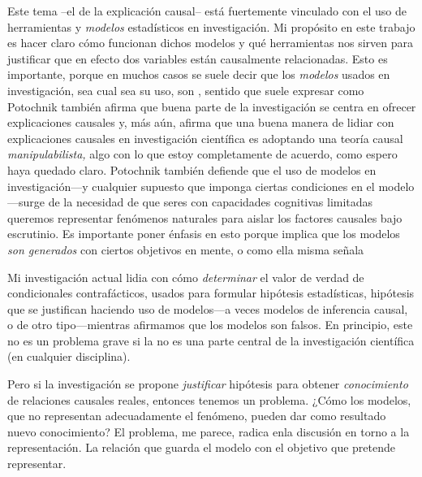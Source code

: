 Este tema --el de la explicación causal-- está fuertemente
vinculado con el uso de herramientas y \emph{modelos}
estadísticos en investigación. Mi propósito en este trabajo
es hacer claro cómo funcionan dichos modelos y qué
herramientas nos sirven para justificar que en efecto dos
variables están causalmente relacionadas. Esto es
importante, porque en muchos casos se suele decir que los
\emph{modelos} usados en investigación, sea cual sea su uso,
son , sentido que suele expresar como
\parencite[p.~18, énfasis agregado]{Potochnik2017-POTIAT-3}
Potochnik también afirma que buena parte de la investigación se
centra en ofrecer explicaciones causales y, más aún, afirma que
una buena manera de lidiar con explicaciones causales en 
investigación científica es adoptando una teoría causal
\emph{manipulabilista,} algo con lo que estoy completamente
de acuerdo, como espero haya quedado claro. Potochnik
también defiende que el uso de modelos en investigación---y
cualquier supuesto que imponga ciertas condiciones en el
modelo---surge de la necesidad de que seres con capacidades
cognitivas limitadas queremos representar fenómenos
naturales para aislar los factores causales bajo escrutinio.
Es importante poner énfasis en esto porque implica que los
modelos \emph{son generados} con ciertos objetivos en mente,
o como ella misma señala 

Mi investigación actual lidia con cómo \emph{determinar} el
valor de verdad de condicionales contrafácticos, usados para
formular hipótesis estadísticas, hipótesis que se justifican
haciendo uso de modelos---a veces modelos de inferencia
causal, o de otro tipo---mientras afirmamos que los
modelos son falsos. En principio, este no es un problema
grave si la  no es una parte central de la
investigación científica (en cualquier disciplina).

Pero si la investigación se propone \emph{justificar}
hipótesis para obtener \emph{conocimiento} de relaciones
causales reales, entonces tenemos un problema. ¿Cómo los
modelos, que no representan adecuadamente el fenómeno,
pueden dar como resultado nuevo conocimiento? El problema,
me parece, radica enla discusión en torno a la
representación. La relación que guarda el modelo con el
objetivo que pretende representar.

